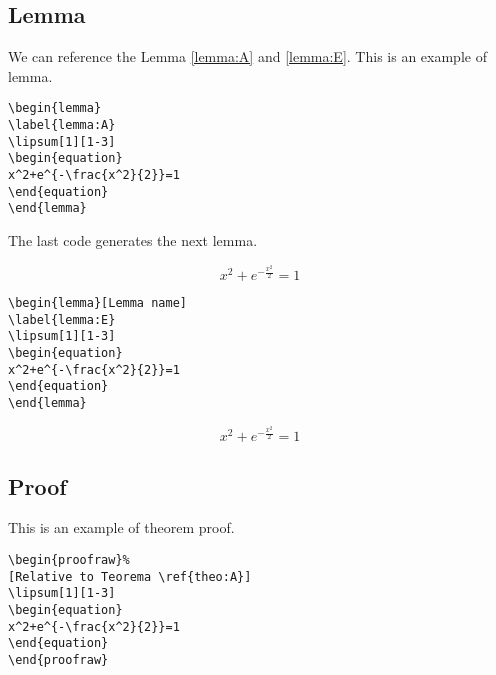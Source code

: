 \subsection{Lemma}

We can reference the Lemma \ref{lemma:A} and \ref{lemma:E}.
This is an example of lemma.
\begin{highlightbox}
\begin{verbatim}
\begin{lemma}
\label{lemma:A}
\lipsum[1][1-3]
\begin{equation}
x^2+e^{-\frac{x^2}{2}}=1
\end{equation}
\end{lemma}
\end{verbatim}
\end{highlightbox}

The last code generates the next lemma.
\begin{lemma}
\label{lemma:A}
\lipsum[1][1-3]
\begin{equation}
x^2+e^{-\frac{x^2}{2}}=1
\end{equation}
\end{lemma}



\begin{highlightbox}
\begin{verbatim}
\begin{lemma}[Lemma name]
\label{lemma:E}
\lipsum[1][1-3]
\begin{equation}
x^2+e^{-\frac{x^2}{2}}=1
\end{equation}
\end{lemma}
\end{verbatim}
\end{highlightbox}
\begin{lemma}
\label{lemma:E}
\lipsum[1][1-3]
\begin{equation}
x^2+e^{-\frac{x^2}{2}}=1
\end{equation}
\end{lemma}


\subsection{Proof}
This is an example of theorem proof.
\begin{highlightbox}
\begin{verbatim}
\begin{proofraw}%
[Relative to Teorema \ref{theo:A}]
\lipsum[1][1-3]
\begin{equation}
x^2+e^{-\frac{x^2}{2}}=1
\end{equation}
\end{proofraw}
\end{verbatim}
\end{highlightbox}


